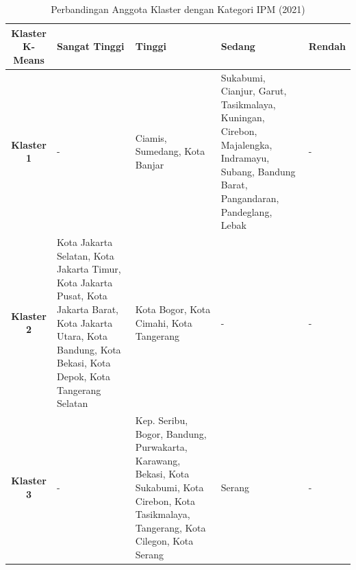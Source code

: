 \begin{table}[H]
\centering
\caption{Perbandingan Anggota Klaster dengan Kategori IPM (2021)} \label{tab:ipm_cross_2021}
\begin{tabular}{|c|p{2cm}|p{2cm}|p{2cm}|p{2cm}|}
\hline
\textbf{Klaster K-Means} & \textbf{Sangat Tinggi} & \textbf{Tinggi} & \textbf{Sedang} & \textbf{Rendah} \\ \hline
\textbf{Klaster 1} & - & Ciamis, Sumedang, Kota Banjar & Sukabumi, Cianjur, Garut, Tasikmalaya, Kuningan, Cirebon, Majalengka, Indramayu, Subang, Bandung Barat, Pangandaran, Pandeglang, Lebak & - \\ \hline
\textbf{Klaster 2} & Kota Jakarta Selatan, Kota Jakarta Timur, Kota Jakarta Pusat, Kota Jakarta Barat, Kota Jakarta Utara, Kota Bandung, Kota Bekasi, Kota Depok, Kota Tangerang Selatan & Kota Bogor, Kota Cimahi, Kota Tangerang & - & - \\ \hline
\textbf{Klaster 3} & - & Kep. Seribu, Bogor, Bandung, Purwakarta, Karawang, Bekasi, Kota Sukabumi, Kota Cirebon, Kota Tasikmalaya, Tangerang, Kota Cilegon, Kota Serang & Serang & - \\ \hline
\end{tabular}
\end{table}